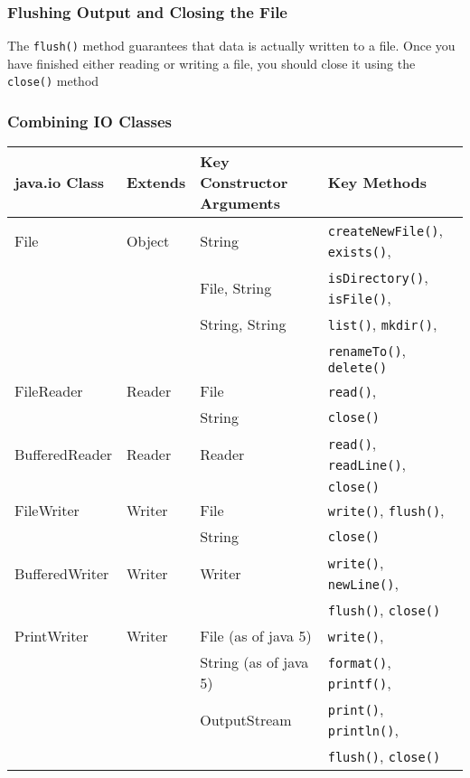 \subsubsection{Flushing Output and Closing the File}
The \verb#flush()# method guarantees that data is actually written to a file.  
Once you have finished either reading or writing a file, you should close it 
using the \verb#close()# method

\subsubsection{Combining IO Classes}
\begin{center}
\begin{tabular}{llll}
    \textbf{java.io Class} & \textbf{Extends} & \textbf{Key Constructor 
    Arguments} & \textbf{Key Methods} \\
    \hline
    File & Object & String & \verb#createNewFile()#, \verb#exists()#, \\
    & & File, String & \verb#isDirectory()#, \verb#isFile()#, \\
    & & String, String & \verb#list()#, \verb#mkdir()#, \\
    & & & \verb#renameTo()#, \verb#delete()# \\
    \hline
    FileReader & Reader & File & \verb#read()#, \\
    & & String & \verb#close()# \\
    \hline
    BufferedReader & Reader & Reader & \verb#read()#, \verb#readLine()#, \\
    & & & \verb#close()# \\
    \hline
    FileWriter & Writer & File & \verb#write()#, \verb#flush()#, \\
    & & String & \verb#close()# \\
    \hline
    BufferedWriter & Writer & Writer & \verb#write()#, \verb#newLine()#, \\
    & & & \verb#flush()#, \verb#close()# \\
    \hline
    PrintWriter & Writer & File (as of java 5) & \verb#write()#, \\
    & & String (as of java 5) & \verb#format()#, \verb#printf()#, \\
    & & OutputStream & \verb#print()#, \verb#println()#, \\
    & & & \verb#flush()#, \verb#close()# \\
\end{tabular}
\end{center}

